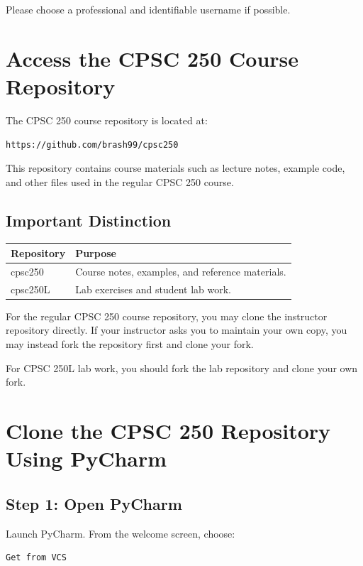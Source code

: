 \documentclass[11pt]{article}
\begin{document}
Please choose a professional and identifiable username if possible.

\section{Access the CPSC 250 Course Repository}

The CPSC 250 course repository is located at:

\begin{lstlisting}[style=terminal]
https://github.com/brash99/cpsc250
\end{lstlisting}

This repository contains course materials such as lecture notes, example code, and other files used in the regular CPSC 250 course.

\subsection*{Important Distinction}

\begin{center}
\begin{tabular}{>{\ttfamily}p{1.3in}p{4.8in}}
\toprule
Repository & Purpose \\
\midrule
cpsc250 & Course notes, examples, and reference materials. \\
cpsc250L & Lab exercises and student lab work. \\
\bottomrule
\end{tabular}
\end{center}

For the regular CPSC 250 course repository, you may clone the instructor repository directly. If your instructor asks you to maintain your own copy, you may instead fork the repository first and clone your fork.

For CPSC 250L lab work, you should fork the lab repository and clone your own fork.

\section{Clone the CPSC 250 Repository Using PyCharm}

\subsection*{Step 1: Open PyCharm}

Launch PyCharm. From the welcome screen, choose:

\begin{lstlisting}[style=terminal]
Get from VCS
\end{lstlisting}
\end{document}
